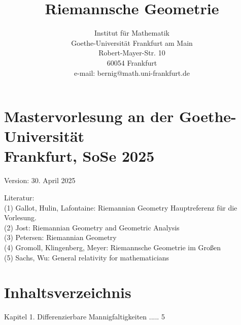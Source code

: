 \documentclass[10pt]{article}
\title{Riemannsche Geometrie }
\author{Institut für Mathematik\\
Goethe-Universität Frankfurt am Main\\
Robert-Mayer-Str. 10\\
60054 Frankfurt\\
e-mail: bernig@math.uni-frankfurt.de}
\date{}
\begin{document}
\maketitle
\section*{Mastervorlesung an der Goethe-Universität \\
 Frankfurt, SoSe 2025 }
Version: 30. April 2025

Literatur:\\
(1) Gallot, Hulin, Lafontaine: Riemannian Geometry Hauptreferenz für die Vorlesung.\\
(2) Jost: Riemannian Geometry and Geometric Analysis\\
(3) Petersen: Riemannian Geometry\\
(4) Gromoll, Klingenberg, Meyer: Riemannsche Geometrie im Großen\\
(5) Sachs, Wu: General relativity for mathematicians

\section*{Inhaltsverzeichnis}
Kapitel 1. Differenzierbare Mannigfaltigkeiten ..... 5
\end{document}

